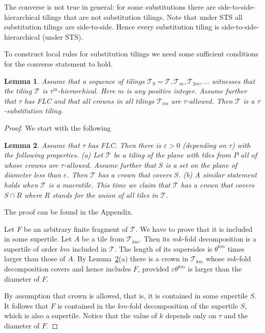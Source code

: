 \documentclass[12pt]{article}
\newtheorem{lemma}{Lemma}
\theoremstyle{remark}
\newcommand{\eps}{\varepsilon}
\begin{document}
The converse is not true in general: for some substitutions there are side-to-side-hierarchical tilings that are not 
substitution tilings. 
Note that under STS 
all substitution tilings are side-to-side.
Hence every substitution tiling is side-to-side-hierarchical (under STS).


To construct local rules for substitution tilings we need some sufficient
conditions for the converse statement to hold.

\begin{lemma}\label{l22}
  Assume that a sequence of tilings
  $\mathcal{T}_0=\mathcal{T}, \mathcal{T}_m, \mathcal{T}_{2m}, \dots$
  witnesses that the tiling   $\mathcal{T}$ is $\tau^m$-hierarchical. Here $m$ is any positive integer.
  Assume further that $\tau$ has FLC and that
  all crowns in all tilings
  $\mathcal{T}_{im}$ are $\tau$-allowed. 
  Then $\mathcal{T}$ is a $\tau$-substitution tiling. 
\end{lemma}
\begin{proof} We start with the following
\begin{lemma}\label{l7}
Assume that $\tau$ has FLC. Then there is $\eps>0$ (depending on $\tau$) with the following properties. 
(a) Let  $\mathcal T$ be a tiling of the plane with tiles from $P$
all of whose crowns are $\tau$-allowed.
Assume further that $S$ is a set on the plane 
of diameter less than $\eps$. 
Then $\mathcal T$ has a crown that covers  $S$.
(b) A similar statement holds when $\mathcal T$ is a macrotile. This time we claim that $\mathcal T$ has a crown that covers  $S\cap R$
where $R$ stands for the union of all tiles in $\mathcal T$.
\end{lemma}
The proof can be found in the Appendix.


 Let $F$ be an arbitrary finite fragment of $\mathcal{T}$. We have to  prove that it is included in some supertile.
 Let $A$ be a tile from $\mathcal{T}_{km}$. Then its $mk$-fold decomposition is a supertile of
order $km$ included in  $\mathcal{T}$. The length of its supersides is $\theta^{km}$
times larger than those of $A$. By Lemma~\ref{l7}(a) there is a crown in  $\mathcal{T}_{km}$ whose
$mk$-fold decomposition covers and hence includes $F$, provided $\eps\theta^{km}$
is larger than the diameter of $F$.

By assumption
that crown is allowed, that is, it is contained in some supertile $S$.
  It follows that $F$ is contained in the $km$-fold decomposition of the supertile $S$,
  which is also a supertile. Notice that the value of $k$
depends only on $\tau$ and the diameter of $F$. 
\end{proof}
\end{document}

